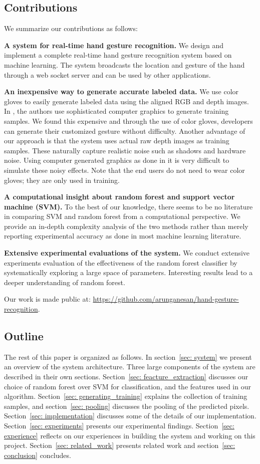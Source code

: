 \subsection{Contributions}
We summarize our contributions as follows:

\textbf{A system for real-time hand gesture recognition.} We design and implement a complete real-time hand gesture recognition system based on machine learning. The system broadcasts the location and gesture of the hand through a web socket server and can be used by other applications.

\textbf{An inexpensive way to generate accurate labeled data.} We use color gloves to easily generate labeled data using the aligned RGB and depth images. In \cite{shotton2011}, the authors use sophisticated computer graphics to generate training samples. We found this expensive and through the use of color gloves, developers can generate their customized gesture without difficulty. Another advantage of our approach is that the system uses actual raw depth images as training samples. These naturally capture realistic noise such as shadows and hardware noise. Using computer generated graphics as done in \cite{shotton2011} it is very difficult to simulate these noisy effects. Note that the end users do not need to wear color gloves; they are only used in training.

\textbf{A computational insight about random forest and support vector machine (SVM).} To the best of our knowledge, there seems to be no literature in comparing SVM and random forest from a computational perspective. We provide an in-depth complexity analysis of the two methods rather than merely reporting experimental accuracy as done in most machine learning literature. 

\textbf{Extensive experimental evaluations of the system.} We conduct extensive experiments evaluation of the effectiveness of the random forest classifier by systematically exploring a large space of parameters. Interesting results lead to a deeper understanding of random forest. 

Our work is made public at: \url{https://github.com/arunganesan/hand-gesture-recognition}.

\subsection{Outline}
The rest of this paper is organized as follows. In section~\ref{sec: system} we present an overview of the system architecture. Three large components of the system are described in their own sections. Section~\ref{sec: feacture_extraction} discusses our choice of random forest over SVM for classification, and the features used in our algorithm. Section~\ref{sec: generating_training} explains the collection of training samples, and section~\ref{sec: pooling} discusses the pooling of the predicted pixels. Section~\ref{sec: implementation} discusses some of the details of our implementation. Section~\ref{sec: experiments} presents our experimental findings. Section~\ref{sec: experience} reflects on our experiences in building the system and working on this project. Section~\ref{sec: related_work} presents related work and section~\ref{sec: conclusion} concludes. 
